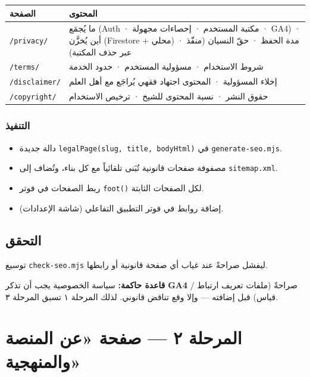 \documentclass[11pt]{article}
\begin{document}
\vspace{6pt}
\renewcommand{\arraystretch}{1.35}
\begin{longtable}{@{}p{} p{}@{}}
\toprule
\textbf{الصفحة} & \textbf{المحتوى} \\
\midrule
\endhead
\texttt{/privacy/} & ما يُجمَع (Auth · مكتبة المستخدم · إحصاءات مجهولة · GA4) · أين يُخزَّن (Firestore + محلي) · مدة الحفظ · حقّ النسيان (منفّذ عبر حذف المكتبة) \\
\texttt{/terms/} & شروط الاستخدام · مسؤولية المستخدم · حدود الخدمة \\
\texttt{/disclaimer/} & إخلاء المسؤولية · المحتوى اجتهاد فقهي يُراجَع مع أهل العلم \\
\texttt{/copyright/} & حقوق النشر · نسبة المحتوى للشيخ · ترخيص الاستخدام \\
\bottomrule
\end{longtable}
\renewcommand{\arraystretch}{1.0}

\subsubsection*{التنفيذ}
\begin{itemize}
  \item دالة جديدة \texttt{legalPage(slug, title, bodyHtml)} في \texttt{generate-seo.mjs}.
  \item مصفوفة صفحات قانونية تُبَنى تلقائياً مع كل بناء، وتُضاف إلى \texttt{sitemap.xml}.
  \item ربط الصفحات في فوتر \texttt{foot()} لكل الصفحات الثابتة.
  \item إضافة روابط في فوتر التطبيق التفاعلي (شاشة الإعدادات).
\end{itemize}

\subsection*{التحقق}
توسيع \texttt{check-seo.mjs} ليفشل صراحةً عند غياب أي صفحة قانونية أو رابطها.

\begin{warnbox}
\textbf{قاعدة حاكمة:} سياسة الخصوصية يجب أن تذكر \textbf{GA4} صراحةً (ملفات تعريف ارتباط / قياس)
قبل إضافته — وإلا وقع تناقض قانوني. لذلك المرحلة ١ تسبق المرحلة ٣.
\end{warnbox}

\section{المرحلة ٢ — صفحة «عن المنصة والمنهجية»}
\end{document}
